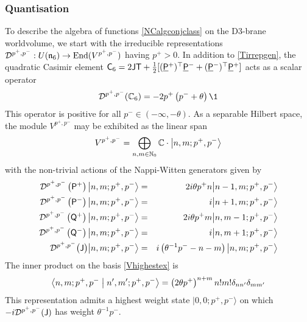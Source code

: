 \subsubsection{Quantisation}
To describe the algebra of functions \eqref{NCalgconjclass} on the D3-brane
worldvolume, we start with the irreducible representations
$\mathcal{D}^{p^+,p^-}:U(\mathfrak{n}_6)\to{\rm End}(V^{p^+,p^-})$ having
$p^+>0$. In addition to \eqref{Tirrepgen}, the quadratic Casimir element ${\sf
  C}_6=2 {\sf J} {\sf T}+\frac12 [( \underline{\sf P}{}^+)^\top \underline{\sf P}{}^-+( \underline{\sf P}{}^-)^\top \underline{\sf P}{}^+]$ acts as a
scalar operator
\begin{equation}
  \label{C6irrep}
  \mathcal{D}^{p^+,p^-}(\C_6)=-2p^+ \left(p^-+\theta\right) \1
\end{equation}
This operator is positive for all $p^-\in(-\infty,-\theta)$. As a separable Hilbert
space, the module $V^{p^+,p^-}$ may be exhibited as the linear span
\begin{equation}
  \label{Vhighestex}
  V^{p^+,p^-}=\bigoplus_{n,m\in{\mathbb N}_0}{\mathbb C}\cdot\bigl|n,m;p^+,p^-
  \bigr\rangle
\end{equation}
with the non-trivial actions of the Nappi-Witten generators given by
\begin{eqnarray}
  \label{highestactions}
  {\mathcal D}^{p^+,p^-}\left({\sf P}^+\right)\bigl|n,m;p^+,p^-\bigr\rangle&=&
  2 i\theta p^+ n \bigl|n-1,m;p^+,p^-\bigr\rangle\\\nonumber
  {\mathcal D}^{p^+,p^-}\left({\sf P}^-\right)\bigl|n,m;p^+,p^-\bigr\rangle&=&
  i\bigl|n+1,m;p^+,p^-\bigr\rangle \\\nonumber
  {\mathcal D}^{p^+,p^-}\left({\sf Q}^+\right)\bigl|n,m;p^+,p^-\bigr\rangle&=&
  2 i\theta p^+ m \bigl|n,m-1;p^+,p^-\bigr\rangle \\\nonumber
  {\mathcal D}^{p^+,p^-}\left({\sf Q}^-\right)\bigl|n,m;p^+,p^-\bigr\rangle&=&
  i\bigl|n,m+1;p^+,p^-\bigr\rangle \\\nonumber
  {\mathcal D}^{p^+,p^-}\bigl({\sf J} \bigr)\bigl|n,m;p^+,p^-\bigr\rangle&=&
  i\left(\theta^{-1} p^--n-m\right)
  \bigl|n,m;p^+,p^-\bigr\rangle
\end{eqnarray}
The inner product on the basis \eqref{Vhighestex} is
\begin{equation}
  \label{highestortho}
  \bigl\langle n,m;p^+,p^-\bigm|n',m';p^+,p^-\bigr\rangle=
  \left(2\theta p^+\right)^{n+m} n! m! \delta_{nn'} \delta_{mm'}
\end{equation}
This representation admits a highest weight state $|0,0;p^+,p^-\rangle$ on which
$- i{\mathcal D}^{p^+,p^-}({\sf J})$ has weight $\theta^{-1} p^-$.

